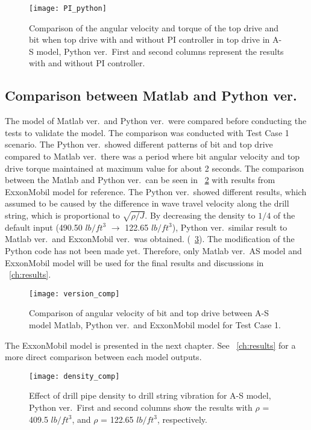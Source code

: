 \begin{figure}
  \centering
  \texttt{[image: PI\_python]}
  \caption[comparison between with and without top drive: Python ver]{Comparison of the angular velocity and torque of the top drive and bit when top drive with and without PI controller in top drive in A-S model, Python ver.\ First and second columns represent the results with and without PI controller.}\label{figure_topdriveremove}
\end{figure}

\subsection{Comparison between Matlab and Python ver.}
The model of Matlab ver.\ and Python ver.\ were compared before conducting the tests to validate the model. The comparison was conducted with Test Case 1 scenario. The Python ver.\ showed different patterns of bit and top drive compared to Matlab ver.\ there was a period where bit angular velocity and top drive torque maintained at maximum value for about 2 seconds. The comparison between the Matlab and Python ver.\ can be seen in \figurename~\ref{figure_Test1_comp_chASmodel} with results from ExxonMobil model for reference. The Python ver.\ showed different results, which assumed to be caused by the difference in wave travel velocity along the drill string, which is proportional to $\sqrt{\rho/J}$. By decreasing the density to $1/4$ of the default input (490.50 $lb/ft^3$ $\rightarrow$ 122.65 $lb/ft^3$), Python ver.\, similar result to Matlab ver.\ and ExxonMobil ver.\ was obtained. (\figurename~\ref{figure_Python_reducedDensity}). The modification of the Python code has not been made yet. Therefore, only Matlab ver.\ AS model and ExxonMobil model will be used for the final results and discussions in \chaptername~\ref{ch:results}.

\begin{figure}
  \centering
  \texttt{[image: version\_comp]}
  \caption[Comparison between different models for Test case 1]{Comparison of angular velocity of bit and top drive between A-S model Matlab, Python ver.\ and ExxonMobil model for Test Case 1.}\label{figure_Test1_comp_chASmodel}
\end{figure}
The ExxonMobil model is presented in the next chapter. See \chaptername~\ref{ch:results} for a more direct comparison between each model outputs.
\begin{figure}
  \centering
  \texttt{[image: density\_comp]}
  \caption[Effect of drill pipe density in Python ver.\ for Test case 1]{Effect of drill pipe density to drill string vibration for A-S model, Python ver.\ First and second columns show the results with $\rho$ = 409.5 $lb/ft^3$, and  $\rho$ = 122.65 $lb/ft^3$, respectively.}\label{figure_Python_reducedDensity}
\end{figure}


